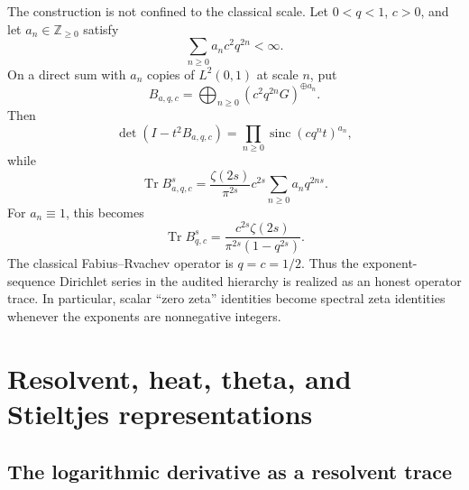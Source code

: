 \documentclass[11pt,oneside]{article}
\theoremstyle{definition}
\newcommand{\Z}{\mathbb Z}
\newcommand{\sinc}{\operatorname{sinc}}
\newcommand{\Tr}{\operatorname{Tr}}
\begin{document}
The construction is not confined to the classical scale.  Let \(0<q<1\), \(c>0\), and
let \(a_n\in\Z_{\ge0}\) satisfy
\begin{equation}
 \sum_{n\ge0}a_n c^2q^{2n}<\infty.
 \label{p1:eq:exp-summability}
\end{equation}
On a direct sum with \(a_n\) copies of \(L^2(0,1)\) at scale \(n\), put
\begin{equation}
 B_{a,q,c}=\bigoplus_{n\ge0}
 \left(c^2q^{2n}G\right)^{\oplus a_n}.
 \label{p1:eq:general-B}
\end{equation}
Then
\begin{equation}
 \det(I-t^2B_{a,q,c})
 =\prod_{n\ge0}\sinc(cq^nt)^{a_n},
 \label{p1:eq:general-det}
\end{equation}
while
\begin{equation}
 \Tr B_{a,q,c}^{s}
 =\frac{\zeta(2s)}{\pi^{2s}}c^{2s}
 \sum_{n\ge0}a_nq^{2ns}.
 \label{p1:eq:general-zeta}
\end{equation}
For \(a_n\equiv1\), this becomes
\begin{equation}
 \Tr B_{q,c}^{s}
 =\frac{c^{2s}\zeta(2s)}{\pi^{2s}(1-q^{2s})}.
 \label{p1:eq:q-geometric-zeta}
\end{equation}
The classical Fabius--Rvachev operator is \(q=c=1/2\).  Thus the exponent-sequence
Dirichlet series in the audited hierarchy is realized as an honest operator trace.  In
particular, scalar ``zero zeta'' identities become spectral zeta identities whenever
the exponents are nonnegative integers.

\section{Resolvent, heat, theta, and Stieltjes representations}
\label{p1:sec:heat}

\subsection{The logarithmic derivative as a resolvent trace}
\end{document}
